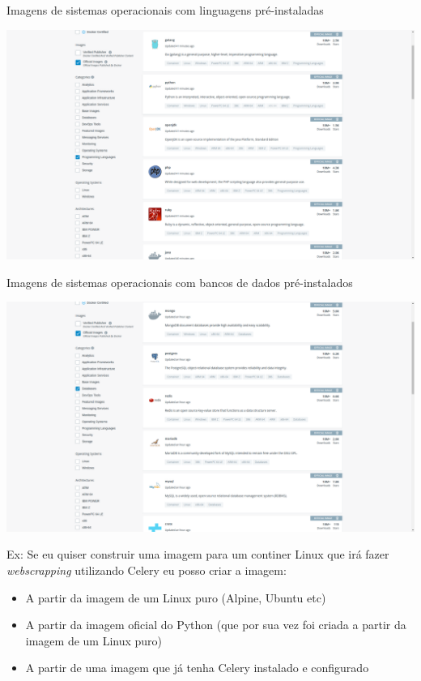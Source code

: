 \documentclass[
  ignorenonframetext,
]{beamer}
\providecommand{\tightlist}{%
  \setlength{\itemsep}{0pt}\setlength{\parskip}{0pt}}
\begin{document}
\begin{frame}

\begin{block}{Imagens de sistemas operacionais com linguagens
pré-instaladas}

\includegraphics{img/hub-languages.png}

\end{block}

\end{frame}

\begin{frame}

\begin{block}{Imagens de sistemas operacionais com bancos de dados
pré-instalados}

\includegraphics{img/hub-db.png}

\end{block}

\end{frame}

\begin{frame}

Ex: Se eu quiser construir uma imagem para um continer Linux que irá
fazer \emph{webscrapping} utilizando Celery eu posso criar a imagem:

\begin{itemize}
\tightlist
\item
  A partir da imagem de um Linux puro (Alpine, Ubuntu etc)
\item
  A partir da imagem oficial do Python (que por sua vez foi criada a
  partir da imagem de um Linux puro)
\item
  A partir de uma imagem que já tenha Celery instalado e configurado
\end{itemize}

\end{frame}
\end{document}
